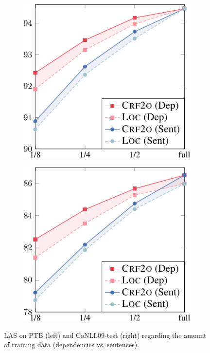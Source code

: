 \begin{figure}[tb]
    \centering
    \begin{subfigure}[b]{0.45\textwidth}
        \centering
        \includegraphics[width=1.\textwidth]{figures/part-gap-ptb.pdf}
    \end{subfigure}
    \begin{subfigure}[b]{0.45\textwidth}
        \centering
        \includegraphics[width=1.\textwidth]{figures/part-gap-conll.pdf}
    \end{subfigure}
    \caption{
        LAS on PTB (left) and CoNLL09-test (right) regarding the amount of training data (dependencies vs. sentences).
    }
    \label{fig:part-gap}
\end{figure}


